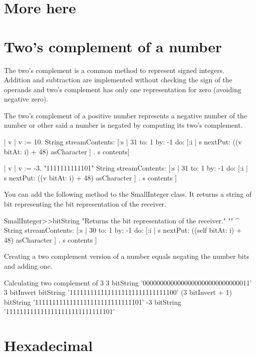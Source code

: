\documentclass[a4paper,10pt,twoside]{book}
\begin{document}
%

\section{More here}

\section{Two's complement of a number}
The two's complement is a common method to represent signed integers. Addition and subtraction are implemented without checking the sign of the operands and two's complement has only one representation for zero (avoiding negative zero).

The two's complement of a positive number represents a negative number of the number or other said a number is negated by computing its two's complement. 


\begin{code}{}
| v |
v := 10. 
String streamContents: [:s | 
	31 to: 1 by: -1 do: [:i | s nextPut: ((v bitAt: i) + 48) asCharacter   ] .
	s contents] 

| v |
v := -3.  "1111111111101"
String streamContents: [:s | 
	31 to: 1 by: -1 do: [:i | s nextPut: ((v bitAt: i) + 48) asCharacter   ] .
	s contents
	] 
\end{code}

You can add the following method  to the SmallInteger class. It returns a string of bit representing the bit representation of the receiver.

\begin{code}{}
SmallInteger>>bitString
	"Returns the bit representation of the receiver."
	""
	^ String streamContents: [:s | 
		30 to: 1 by: -1 do: [:i | s nextPut: ((self bitAt: i) + 48) asCharacter ] .
		s contents ]
\end{code}




Creating a two complement version of a number equals negating the number bits and adding one.
\begin{code}{Calculating two complement of 3}
3 bitString '0000000000000000000000000000011'
3 bitInvert bitString '1111111111111111111111111111100'
(3 bitInvert + 1) bitString '1111111111111111111111111111101'
-3 bitString '1111111111111111111111111111101'
\end{code}






\section{Hexadecimal}
\end{document}
